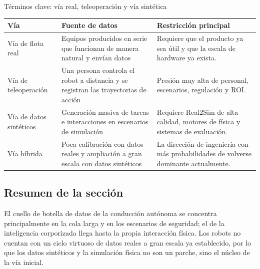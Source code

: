 \begin{knowledgebox}{Términos clave: vía real, teleoperación y vía sintética}
\begin{tabularx}{\textwidth}{p{}p{}X}
\toprule
Vía & Fuente de datos & Restricción principal \\
\midrule
Vía de flota real & Equipos producidos en serie que funcionan de manera natural y envían datos & Requiere que el producto ya sea útil y que la escala de hardware ya exista. \\
Vía de teleoperación & Una persona controla el robot a distancia y se registran las trayectorias de acción & Presión muy alta de personal, escenarios, regulación y ROI. \\
Vía de datos sintéticos & Generación masiva de tareas e interacciones en escenarios de simulación & Requiere Real2Sim de alta calidad, motores de física y sistemas de evaluación. \\
Vía híbrida & Poca calibración con datos reales y ampliación a gran escala con datos sintéticos & La dirección de ingeniería con más probabilidades de volverse dominante actualmente. \\
\bottomrule
\end{tabularx}
\end{knowledgebox}

\subsection{Resumen de la sección}

El cuello de botella de datos de la conducción autónoma se concentra principalmente en la cola larga y en los escenarios de seguridad; el de la inteligencia corporizada llega hasta la propia interacción física. Los robots no cuentan con un ciclo virtuoso de datos reales a gran escala ya establecido, por lo que los datos sintéticos y la simulación física no son un parche, sino el núcleo de la vía inicial.
